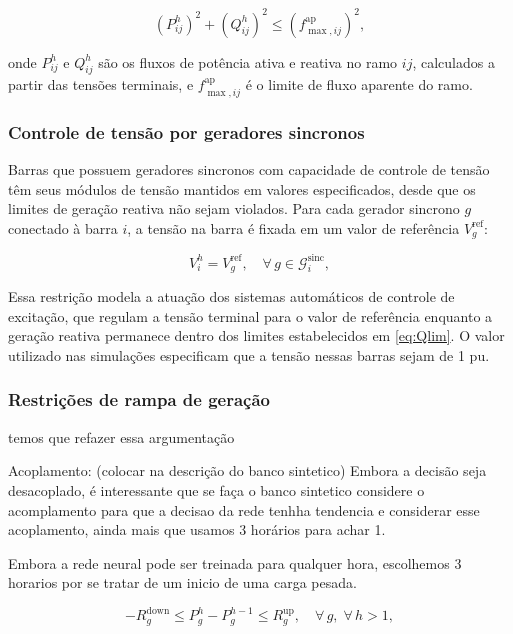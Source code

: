 \documentclass[conference]{IEEEtran}
\begin{document}
\begin{equation}
\left(P_{ij}^{h}\right)^2 + \left(Q_{ij}^{h}\right)^2
    \leq \left(f_{\max,ij}^{\text{ap}}\right)^2,
\label{eq:flow_lim}
\end{equation}

\noindent onde $P_{ij}^{h}$ e $Q_{ij}^{h}$ são os fluxos de potência ativa e reativa no ramo $ij$, calculados a partir das tensões terminais, e $f_{\max,ij}^{\text{ap}}$ é o limite de fluxo aparente do ramo.

\subsubsection{Controle de tensão por geradores sincronos}

Barras que possuem geradores sincronos com capacidade de controle de tensão têm seus módulos de tensão mantidos em valores especificados, desde que os limites de geração reativa não sejam violados. Para cada gerador sincrono $g$ conectado à barra $i$, a tensão na barra é fixada em um valor de referência $V_{g}^{\text{ref}}$:

\begin{equation}
V_{i}^{h} = V_{g}^{\text{ref}}, \quad \forall\, g \in \mathcal{G}_i^{\text{sinc}},
\label{eq:PV_control}
\end{equation}

\noindent Essa restrição modela a atuação dos sistemas automáticos de controle de excitação, que regulam a tensão terminal para o valor de referência enquanto a geração reativa permanece dentro dos limites estabelecidos em \eqref{eq:Qlim}. O valor utilizado nas simulações especificam que a tensão nessas barras sejam de 1 pu.

\subsubsection{Restrições de rampa de geração}

temos que refazer essa argumentação

 Acoplamento: (colocar na descrição do banco sintetico) Embora a decisão seja desacoplado, é interessante que se faça o banco sintetico considere o acomplamento para que a decisao da rede tenhha tendencia e considerar esse acoplamento, ainda mais que usamos 3 horários para achar 1.

Embora a rede neural pode ser treinada para qualquer hora, escolhemos 3 horarios por se tratar de um inicio de uma carga pesada.

\begin{equation}
-R_{g}^{\text{down}} \leq P_{g}^{h} - P_{g}^{h-1} \leq R_{g}^{\text{up}},
\quad \forall\, g,\; \forall\, h > 1,
\label{eq:ramp}
\end{equation}
\end{document}
